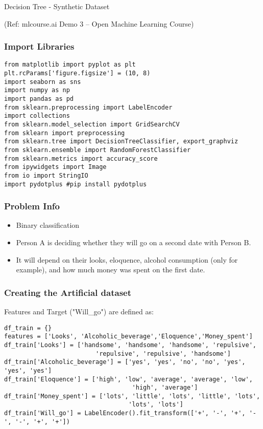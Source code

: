 \begin{frame}[fragile]\frametitle{}
\begin{center}
{\Large Decision Tree  - Synthetic Dataset}

{\tiny (Ref: mlcourse.ai Demo 3 – Open Machine Learning Course) }

\end{center}

\end{frame}

\begin{frame}[fragile]\frametitle{Import Libraries}	
\begin{lstlisting}
from matplotlib import pyplot as plt
plt.rcParams['figure.figsize'] = (10, 8)
import seaborn as sns
import numpy as np
import pandas as pd
from sklearn.preprocessing import LabelEncoder
import collections
from sklearn.model_selection import GridSearchCV
from sklearn import preprocessing
from sklearn.tree import DecisionTreeClassifier, export_graphviz
from sklearn.ensemble import RandomForestClassifier
from sklearn.metrics import accuracy_score
from ipywidgets import Image
from io import StringIO
import pydotplus #pip install pydotplus
\end{lstlisting}
\end{frame}

\begin{frame}[fragile]\frametitle{Problem Info}	
\begin{itemize}
\item Binary classification
\item Person A is deciding whether they will go on a second date with Person B. 
\item It will depend on their looks, eloquence, alcohol consumption (only for example), and how much money was spent on the first date.
\end{itemize}
\end{frame}



\begin{frame}[fragile]\frametitle{Creating the Artificial dataset}	
Features and Target ("Will\_go") are defined as:
\begin{lstlisting}
df_train = {}
features = ['Looks', 'Alcoholic_beverage','Eloquence','Money_spent']
df_train['Looks'] = ['handsome', 'handsome', 'handsome', 'repulsive',
                         'repulsive', 'repulsive', 'handsome'] 
df_train['Alcoholic_beverage'] = ['yes', 'yes', 'no', 'no', 'yes', 'yes', 'yes']
df_train['Eloquence'] = ['high', 'low', 'average', 'average', 'low',
                                   'high', 'average']
df_train['Money_spent'] = ['lots', 'little', 'lots', 'little', 'lots',
                                  'lots', 'lots']
df_train['Will_go'] = LabelEncoder().fit_transform(['+', '-', '+', '-', '-', '+', '+'])
\end{lstlisting}
\end{frame}

